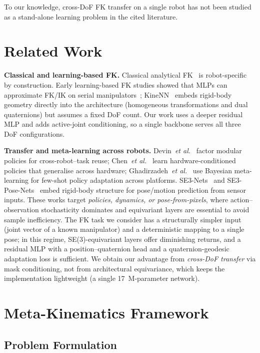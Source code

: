 \documentclass[conference]{IEEEtran}
\begin{document}
To our knowledge, cross-DoF FK transfer on a single robot has not been studied as a stand-alone learning problem in the cited literature.

\section{Related Work}\label{sec:related}

\textbf{Classical and learning-based FK.}
Classical analytical FK~\cite{siciliano2009} is robot-specific by construction. Early learning-based FK studies showed that MLPs can approximate FK/IK on serial manipulators~\cite{duka2014,koker2004}; KineNN~\cite{diprasetya2025} embeds rigid-body geometry directly into the architecture (homogeneous transformations and dual quaternions) but assumes a fixed DoF count. Our work uses a deeper residual MLP and adds active-joint conditioning, so a single backbone serves all three DoF configurations.

\textbf{Transfer and meta-learning across robots.}
Devin~\emph{et al.}~\cite{devin2017} factor modular policies for cross-robot--task reuse; Chen~\emph{et al.}~\cite{chen2018} learn hardware-conditioned policies that generalise across hardware; Ghadirzadeh~\emph{et al.}~\cite{ghadirzadeh2021} use Bayesian meta-learning for few-shot policy adaptation across platforms. SE3-Nets~\cite{byravan2017} and SE3-Pose-Nets~\cite{byravan2018} embed rigid-body structure for pose/motion prediction from sensor inputs. These works target \emph{policies, dynamics, or pose-from-pixels}, where action--observation stochasticity dominates and equivariant layers are essential to avoid sample inefficiency. The FK task we consider has a structurally simpler input (joint vector of a known manipulator) and a deterministic mapping to a single pose; in this regime, SE(3)-equivariant layers offer diminishing returns, and a residual MLP with a position--quaternion head and a quaternion-geodesic adaptation loss is sufficient. We obtain our advantage from \emph{cross-DoF transfer} via mask conditioning, not from architectural equivariance, which keeps the implementation lightweight (a single 17~M-parameter network).

\section{Meta-Kinematics Framework}\label{sec:method}

\subsection{Problem Formulation}
\end{document}
